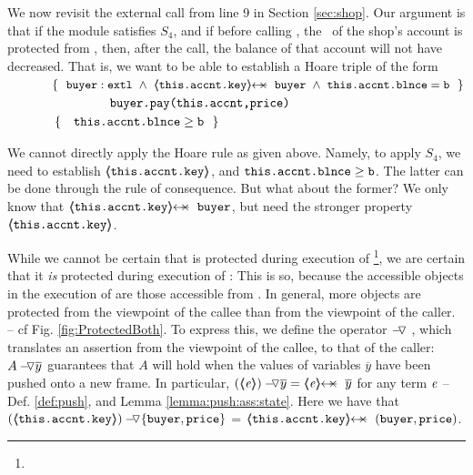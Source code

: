  We now  revisit the external call from line 9 in Section \ref{sec:shop}. Our argument is that if the module satisfies $S_4$, and if before calling , the \password\ of the shop's account is protected from , then, after the call, the balance of that account will not have decreased. 
 That is, we want to be able to establish   a Hoare triple of the form
 \\
$\strut \ \ \ \ \ \ \ \ \ \ \  \{\  \ { \external{\prg{buyer}}} \ \wedge\ {\protectedFrom {\prg{this.\myAccount.key}} {\prg{buyer}}\ \wedge\ {\prg{this.\myAccount.\balance}}=\prg{b}    }\ \  \}$\\
$\strut \ \ \ \ \ \ \ \ \ \ \   \ \ \ \ \ \ \ \ \ \ \ \ {\ \prg{buyer.pay(this.accnt,price)}   \ } $\\
$\strut \ \ \ \ \ \ \ \ \ \ \  \{\  \ \  {\prg{this.\myAccount.\balance}} \geq  \prg{b} \  \  \}$ 

We cannot directly apply the Hoare rule as given above. Namely, to apply $S_4$, we need to establish  
${\inside {\prg{this.\myAccount.key}}}$, and  $\prg{this.\myAccount.\balance}\geq\prg{b}$. 
The latter can be done through the rule of consequence. 
But what about the former? 
We only know that $\protectedFrom {\prg{this.\myAccount.key}} {\prg{buyer}}$, but   need the stronger property  ${\inside {\prg{this.\myAccount.key}}}$. 

 {While we cannot be certain that  
 {is  protected during execution of \footnote{}, we are certain that it  \emph{is} protected during execution} of : 
This is so, because the   accessible objects in the execution of  are those accessible from .
{In general, more objects are protected from the viewpoint of the callee than from the viewpoint of the caller. -- cf Fig.  \ref{fig:ProtectedBoth}.
To express this,} we define the operator $\pushSymbolAA$ , which   translates an assertion from the viewpoint of the callee, to that of the caller:
 $\PushAS y A$   guarantees that $A$ will hold when the values of variables $\overline y$ have been pushed onto a new frame. 
 In particular,   $\PushAS y {(\inside \re)} =  \protectedFrom \re {\overline {y} }$ for any term  $\re$ -- \cf 
 Def. \ref{def:push},  and Lemma \ref{lemma:push:ass:state}.
Here we have that 
 $\PushASLong {\{\prg{buyer},\prg{price}\}}  {(\inside {\prg{this.\myAccount.key}})}$
 =  $\protectedFrom {\prg{this.\myAccount.key}} {(\prg{buyer},\prg{price})}$.}



